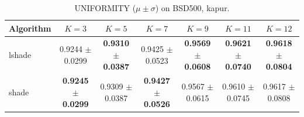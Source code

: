 \begin{table}[htbp]
\centering
\caption{UNIFORMITY ($\mu \pm \sigma$) on BSD500, kapur.}
\label{tab:exp1-kapur-uniformity}
\begin{tabular}{lcccccc}
\toprule
Algorithm & $K=3$ & $K=5$ & $K=7$ & $K=9$ & $K=11$ & $K=12$ \\
\midrule
lshade & 0.9244 $\pm$ 0.0299 & \textbf{0.9310 $\pm$ 0.0387} & 0.9425 $\pm$ 0.0523 & \textbf{0.9569 $\pm$ 0.0608} & \textbf{0.9621 $\pm$ 0.0740} & \textbf{0.9618 $\pm$ 0.0804} \\
shade & \textbf{0.9245 $\pm$ 0.0299} & 0.9309 $\pm$ 0.0387 & \textbf{0.9427 $\pm$ 0.0526} & 0.9567 $\pm$ 0.0615 & 0.9610 $\pm$ 0.0745 & 0.9617 $\pm$ 0.0808 \\
\bottomrule
\end{tabular}
\end{table}